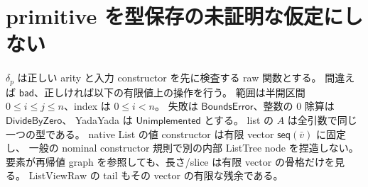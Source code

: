\documentclass[11pt,a4paper]{article}
\newcommand{\Bad}{\mathsf{bad}}
\begin{document}
\section{primitive を型保存の未証明な仮定にしない}
\label{sec:prim}

\(\delta_p\) は正しい arity と入力 constructor を先に検査する raw 関数とする。
間違えば \(\Bad\)、正しければ以下の有限値上の操作を行う。
範囲は半開区間 \(0\leq i\leq j\leq n\)、index は \(0\leq i<n\)。
失敗は \(\mathsf{BoundsError}\)、整数の 0 除算は \(\mathsf{DivideByZero}\)、
YadaYada は \(\mathsf{Unimplemented}\) とする。
list の \(A\) は全引数で同じ一つの型である。
native List の値 constructor は有限 vector \(\mathsf{seq}(\bar v)\) に固定し、
一般の nominal constructor 規則で別の内部 ListTree node を捏造しない。
要素が再帰値 graph を参照しても、長さ/slice は有限 vector の骨格だけを見る。
ListViewRaw の tail もその vector の有限な残余である。
\end{document}
